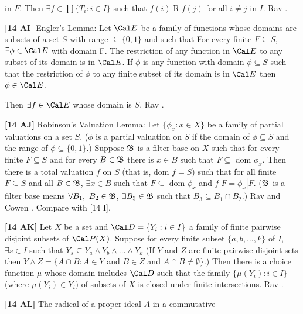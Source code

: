 in $F$. Then $\exists f\in\prod\{T_i: i\in I\}$ such that $f(i)\mathrel
R f(j)$ for all $i\neq j$ in $I$. \ac{Rav} \cite{1977}.
\smallskip
\item{}{\bf [14 AI]}  Engler's Lemma: Let ${\Cal E}$ be a family of
functions  whose domains are subsets of a set $S$ with range $\subseteq
\{0,1\}$ and such that
 For every finite $F\subseteq S$, $\exists \phi \in {\Cal E}$
with domain F.
 The restriction of any function in ${\Cal E}$ to any subset
of its domain is in ${\Cal E}$.
If $\phi $ is any function with domain $\phi\subseteq S$  such
that  the restriction of $\phi $ to any finite subset of its domain is in
${\Cal E}$ then $\phi \in  {\Cal E}$.
\item{} Then $\exists f\in {\Cal E}$ whose domain is $S$.
\ac{Rav} \cite{1977}. 
\smallskip
\item{}{\bf [14 AJ]}  Robinson's Valuation Lemma: Let $\{\phi_{x}:
x\in X\}$ be a family of partial valuations on a set $S$. ($\phi$ is a
partial valuation on $S$ if the domain of $\phi\subseteq S$ and the
range of $\phi \subseteq  \{ 0,1\}$.)  Suppose $\frak B$ is a filter
base on $X$ such that for every finite $F\subseteq S$ and for
every $B\in\frak B$ there is $x\in B$ such that $F\subseteq$ dom
$\phi_{x}$. Then there is a total valuation $f$ on $S$ (that is, dom $f
= S$) such that for all finite $F\subseteq S$ and all $B\in\frak B$,
$\exists x\in B$ such that $F\subseteq$ dom $\phi_{x}$ and $f|F = \phi_x
|F$. ($\frak B$ is a filter base means $\forall B_{1},\ B_{2}\in\frak B$,
$\exists B_{3}\in\frak B$ such that $B_{3}\subseteq B_{1}\cap B_{2}.)$
\ac{Rav} \cite{1977} and \ac{Cowen} \cite{1973}.  Compare with [14 I].
\smallskip
\item{}{\bf [14 AK]}  Let $X$ be a set and ${\Cal D}=\{Y_{i}: i\in I\}$ a
family of finite pairwise disjoint subsets of ${\Cal P}(X)$.
Suppose for every finite subset $\{a, b,\ldots, k\}$ of $I$,
$\exists s\in I$ such that $Y_{s}\subseteq Y_{a}\land Y_{b}\land \ldots
\land Y_{k}$ (If $Y$ and $Z$ are finite pairwise disjoint sets then
$Y\land  Z = \{A\cap B: A\in Y$ and $B\in Z$ and
$A\cap B\neq\emptyset\}$.) Then there is a choice function $\mu$ whose
domain includes ${\Cal D}$ such that the family $\{\mu(Y_{i}): i\in I\}$
(where $\mu(Y_{i})\in Y_{i})$ of subsets of $X$ is closed under finite
intersections.  \ac{Rav} \cite{1977}.
\smallskip
\item{}{\bf [14 AL]}  The radical of a proper ideal $A$ in a commutative
